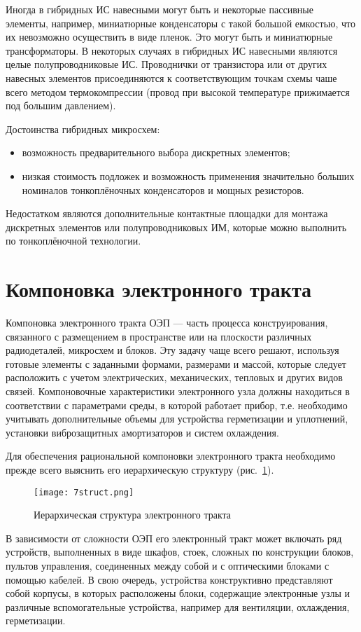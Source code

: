 Иногда в гибридных ИС навесными могут быть и некоторые пассивные элементы, например, миниатюрные конденсаторы с такой большой емкостью, что их невозможно осуществить в виде пленок. Это могут быть и миниатюрные трансформаторы. В некоторых случаях в гибридных ИС навесными являются целые полупроводниковые ИС. Проводнички от транзистора или от других навесных элементов присоединяются к соответствующим точкам схемы чаше всего методом термокомпрессии (провод при высокой температуре прижимается под большим давлением).

Достоинства гибридных микросхем:
\begin{itemize}
\item возможность предварительного выбора дискретных элементов;
\item низкая стоимость подложек и возможность применения значительно больших номиналов тонкоплёночных конденсаторов и мощных резисторов.
\end{itemize}

Недостатком являются дополнительные контактные площадки для монтажа дискретных элементов или полупроводниковых ИМ, которые можно выполнить по тонкоплёночной технологии.

\section{Компоновка электронного тракта}

Компоновка электронного тракта ОЭП --- часть процесса конструирования, связанного с размещением в пространстве или на плоскости различных радиодеталей, микросхем и блоков. Эту задачу чаще всего решают, используя готовые элементы с заданными формами, размерами и массой, которые следует расположить с учетом электрических, механических, тепловых и других видов связей. Компоновочные характеристики электронного узла должны находиться в соответствии с параметрами среды, в которой работает прибор, т.е. необходимо учитывать дополнительные объемы для устройства герметизации и уплотнений, установки виброзащитных амортизаторов и систем охлаждения.

Для обеспечения рациональной компоновки электронного тракта необходимо прежде всего выяснить его иерархическую структуру (рис.~\ref{pic:7struct}).
\begin{figure}[h!]
	\caption{ Иерархическая структура электронного тракта }
	\texttt{[image: 7struct.png]}
	\label{pic:7struct}
\end{figure}

В зависимости от сложности ОЭП его электронный тракт может включать ряд устройств, выполненных в виде шкафов, стоек, сложных по конструкции блоков, пультов управления, соединенных между собой и с оптическими блоками с помощью кабелей. В свою очередь, устройства конструктивно представляют собой корпусы, в которых расположены блоки, содержащие электронные узлы и различные вспомогательные устройства, например для вентиляции, охлаждения, герметизации. 

